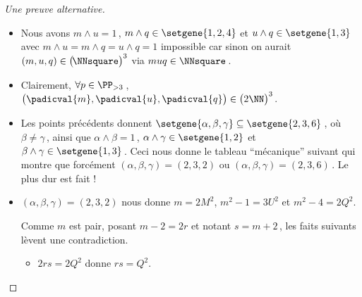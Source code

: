 \begin{proof}[Une preuve alternative]
\begin{itemize}
		\item Nous avons $m \wedge u = 1$\,, $m \wedge q \in \setgene{1, 2, 4}$ et $u \wedge q \in \setgene{1, 3}$
		avec $m \wedge u = m \wedge q = u \wedge q = 1$ impossible car sinon on aurait $(m, u, q) \in \big( \kern-1.5pt\NNsquare \big)^3$ via $muq \in \NNsquare$\,.


		\item Clairement, $\forall p \in \PP_{>3}$\,, $\big( \padicval{m} , \padicval{u} , \padicval{q} \big) \in \big( 2 \NN \big)^3$.


		\item Les points précédents donnent 
		$\setgene{\alpha, \beta, \gamma} \subseteq \setgene{2, 3, 6}$\,,
		où $\beta \neq \gamma$\,,
		ainsi que 
		$\alpha \wedge \beta = 1$\,, $\alpha \wedge \gamma \in \setgene{1, 2}$ et $\beta \wedge \gamma \in \setgene{1, 3}$\,.
		Ceci nous donne le tableau \enquote{mécanique} suivant qui montre que forcément $(\alpha, \beta, \gamma) = (2, 3, 2)$ ou $(\alpha, \beta, \gamma) = (2, 3, 6)$\,. Le plus dur est fait !
	\end{itemize}

	\begin{center}
	\end{center}


	\begin{itemize}
		\item $(\alpha, \beta, \gamma) = (2, 3, 2)$ nous donne $m = 2 M^2$, $m^2 - 1 = 3 U^2$ et $m^2 - 4 = 2 Q^2$.

		\noindent
		Comme $m$ est pair, posant $m - 2 = 2 r$ et notant $s = m + 2$\,, les faits suivants lèvent une contradiction.
		\begin{itemize}
			\item $2 r s = 2 Q^2$ donne $r s = Q^2$.
			

\end{itemize}
\end{itemize}
\end{proof}
